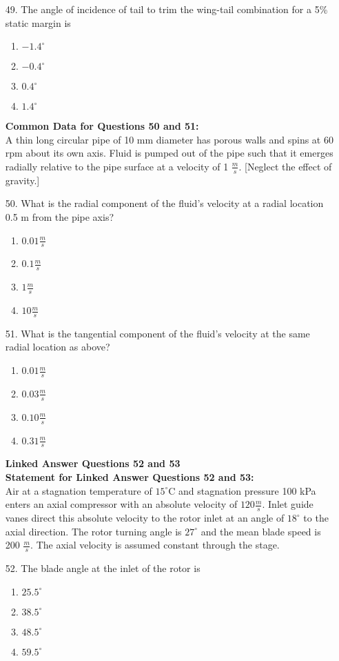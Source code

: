 \documentclass[journal]{IEEEtran}
\begin{document}
\begin{enumerate}
\begin{enumerate}[label=(\Alph*)]
    \end{enumerate}
    \item[49.] The angle of incidence of tail to trim the wing-tail combination for a 5\% static margin is 
     \begin{enumerate}[label=(\Alph*)]
        \item $-1.4^{\circ}$
        \item $-0.4^{\circ}$
        \item $0.4^{\circ}$
        \item $1.4^{\circ}$
     \end{enumerate}
     \textbf{Common Data for Questions 50 and 51:}\\
     A thin long circular pipe of 10 mm diameter has porous walls and spins at 60 rpm about its own axis. Fluid
     is pumped out of the pipe such that it emerges radially relative to the pipe surface at a velocity of 1 $\frac{m}{s}$.
     [Neglect the effect of gravity.] 
    \item[50.] What is the radial component of the fluid's velocity at a radial location 0.5 m from the pipe axis?
    \begin{enumerate}[label=(\Alph*)]
        \item $0.01\frac{m}{s}$
        \item $0.1\frac{m}{s}$
        \item $1\frac{m}{s}$
        \item $10\frac{m}{s}$
    \end{enumerate}
    \item[51.] What is the tangential component of the fluid's velocity at the same radial location as above? 
    \begin{enumerate}[label=(\Alph*)]
        \item $0.01\frac{m}{s}$
        \item $0.03\frac{m}{s}$
        \item $0.10\frac{m}{s}$
        \item $0.31\frac{m}{s}$
    \end{enumerate}
    \textbf{Linked Answer Questions 52 and 53}\\
    \textbf{Statement for Linked Answer Questions 52 and 53:}\\
    Air at a stagnation temperature of $15^{\circ}$C and stagnation pressure 100 kPa enters an axial compressor with an
absolute velocity of $120\frac{m}{s}$. Inlet guide vanes direct this absolute velocity to the rotor inlet at an angle of
$18^{\circ}$ to the axial direction. The rotor turning angle is $27^{\circ}$ and the mean blade speed is 200 $\frac{m}{s}$. The axial
velocity is assumed constant through the stage.
    \item[52.] The blade angle at the inlet of the rotor is 
    \begin{enumerate}[label=(\Alph*)]
        \item $25.5^{\circ}$ 
        \item $38.5^{\circ}$ 
        \item $48.5^{\circ}$ 
        \item $59.5^{\circ}$ 
    \end{enumerate} 
\end{enumerate}
\end{document}
